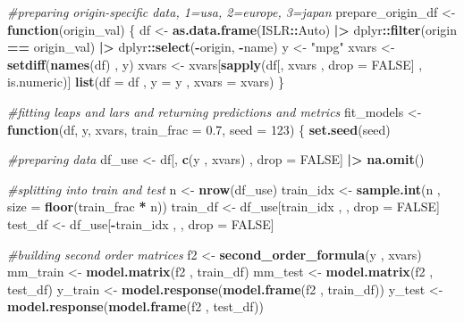 \documentclass[
]{article}
\newenvironment{Shaded}{\begin{snugshade}}{\end{snugshade}}
\newcommand{\AttributeTok}[1]{\textcolor[rgb]{0.13,0.29,0.53}{#1}}
\newcommand{\CommentTok}[1]{\textcolor[rgb]{0.56,0.35,0.01}{\textit{#1}}}
\newcommand{\ConstantTok}[1]{\textcolor[rgb]{0.56,0.35,0.01}{#1}}
\newcommand{\ControlFlowTok}[1]{\textcolor[rgb]{0.13,0.29,0.53}{\textbf{#1}}}
\newcommand{\DecValTok}[1]{\textcolor[rgb]{0.00,0.00,0.81}{#1}}
\newcommand{\FloatTok}[1]{\textcolor[rgb]{0.00,0.00,0.81}{#1}}
\newcommand{\FunctionTok}[1]{\textcolor[rgb]{0.13,0.29,0.53}{\textbf{#1}}}
\newcommand{\NormalTok}[1]{#1}
\newcommand{\OtherTok}[1]{\textcolor[rgb]{0.56,0.35,0.01}{#1}}
\newcommand{\SpecialCharTok}[1]{\textcolor[rgb]{0.81,0.36,0.00}{\textbf{#1}}}
\newcommand{\StringTok}[1]{\textcolor[rgb]{0.31,0.60,0.02}{#1}}
\begin{document}
\begin{Shaded}
\begin{Highlighting}[]
\CommentTok{\#preparing origin{-}specific data, 1=usa, 2=europe, 3=japan}
\NormalTok{prepare\_origin\_df }\OtherTok{\textless{}{-}} \ControlFlowTok{function}\NormalTok{(origin\_val)}
\NormalTok{\{}
\NormalTok{  df }\OtherTok{\textless{}{-}} \FunctionTok{as.data.frame}\NormalTok{(ISLR}\SpecialCharTok{::}\NormalTok{Auto) }\SpecialCharTok{|\textgreater{}}\NormalTok{ dplyr}\SpecialCharTok{::}\FunctionTok{filter}\NormalTok{(origin }\SpecialCharTok{==}\NormalTok{ origin\_val) }\SpecialCharTok{|\textgreater{}}\NormalTok{ dplyr}\SpecialCharTok{::}\FunctionTok{select}\NormalTok{(}\SpecialCharTok{{-}}\NormalTok{origin, }\SpecialCharTok{{-}}\NormalTok{name)}
\NormalTok{  y }\OtherTok{\textless{}{-}} \StringTok{"mpg"}
\NormalTok{  xvars }\OtherTok{\textless{}{-}} \FunctionTok{setdiff}\NormalTok{(}\FunctionTok{names}\NormalTok{(df) , y)}
\NormalTok{  xvars }\OtherTok{\textless{}{-}}\NormalTok{ xvars[}\FunctionTok{sapply}\NormalTok{(df[, xvars , }\AttributeTok{drop =} \ConstantTok{FALSE}\NormalTok{] , is.numeric)]}
  \FunctionTok{list}\NormalTok{(}\AttributeTok{df =}\NormalTok{ df , }\AttributeTok{y =}\NormalTok{ y , }\AttributeTok{xvars =}\NormalTok{ xvars)}
\NormalTok{\}}


\CommentTok{\#fitting leaps and lars and returning predictions and metrics}
\NormalTok{fit\_models }\OtherTok{\textless{}{-}} \ControlFlowTok{function}\NormalTok{(df, y, xvars, }\AttributeTok{train\_frac =} \FloatTok{0.7}\NormalTok{, }\AttributeTok{seed =} \DecValTok{123}\NormalTok{)}
\NormalTok{\{}
  \FunctionTok{set.seed}\NormalTok{(seed)}

  \CommentTok{\#preparing data}
\NormalTok{  df\_use }\OtherTok{\textless{}{-}}\NormalTok{ df[, }\FunctionTok{c}\NormalTok{(y , xvars) , drop }\OtherTok{=} \ConstantTok{FALSE}\NormalTok{] }\SpecialCharTok{|\textgreater{}} \FunctionTok{na.omit}\NormalTok{()}

  \CommentTok{\#splitting into train and test}
\NormalTok{  n }\OtherTok{\textless{}{-}} \FunctionTok{nrow}\NormalTok{(df\_use)}
\NormalTok{  train\_idx }\OtherTok{\textless{}{-}} \FunctionTok{sample.int}\NormalTok{(n , }\AttributeTok{size =} \FunctionTok{floor}\NormalTok{(train\_frac }\SpecialCharTok{*}\NormalTok{ n))}
\NormalTok{  train\_df }\OtherTok{\textless{}{-}}\NormalTok{ df\_use[train\_idx , , drop }\OtherTok{=} \ConstantTok{FALSE}\NormalTok{]}
\NormalTok{  test\_df  }\OtherTok{\textless{}{-}}\NormalTok{ df\_use[}\SpecialCharTok{{-}}\NormalTok{train\_idx , , drop }\OtherTok{=} \ConstantTok{FALSE}\NormalTok{]}

  \CommentTok{\#building second order matrices}
\NormalTok{  f2 }\OtherTok{\textless{}{-}} \FunctionTok{second\_order\_formula}\NormalTok{(y , xvars)}
\NormalTok{  mm\_train }\OtherTok{\textless{}{-}} \FunctionTok{model.matrix}\NormalTok{(f2 , train\_df)}
\NormalTok{  mm\_test  }\OtherTok{\textless{}{-}} \FunctionTok{model.matrix}\NormalTok{(f2 , test\_df)}
\NormalTok{  y\_train  }\OtherTok{\textless{}{-}} \FunctionTok{model.response}\NormalTok{(}\FunctionTok{model.frame}\NormalTok{(f2 , train\_df))}
\NormalTok{  y\_test   }\OtherTok{\textless{}{-}} \FunctionTok{model.response}\NormalTok{(}\FunctionTok{model.frame}\NormalTok{(f2 , test\_df))}


\end{Highlighting}
\end{Shaded}
\end{document}
